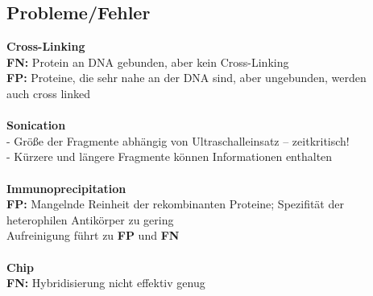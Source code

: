 \subsection{Probleme/Fehler}
\textbf{Cross-Linking}\\
\hspace*{10mm}\textbf{FN:} Protein an DNA gebunden, aber kein Cross-Linking\\
\hspace*{10mm}\textbf{FP:} Proteine, die sehr nahe an der DNA sind, aber ungebunden, werden\\ \hspace*{19mm}auch cross linked\\
\\
\textbf{Sonication}\\
\hspace*{10mm}- Größe der Fragmente abhängig von Ultraschalleinsatz – zeitkritisch!\\
\hspace*{10mm}- Kürzere und längere Fragmente können Informationen enthalten\\
\\
\textbf{Immunoprecipitation}\\
\hspace*{10mm}\textbf{FP:} Mangelnde Reinheit der rekombinanten Proteine; Spezifität der\\
\hspace*{19mm}heterophilen Antikörper zu gering\\
\hspace*{19mm}Aufreinigung führt zu \textbf{FP} und \textbf{FN}\\
\\
\textbf{Chip}\\
\hspace*{10mm}\textbf{FN:} Hybridisierung nicht effektiv genug

